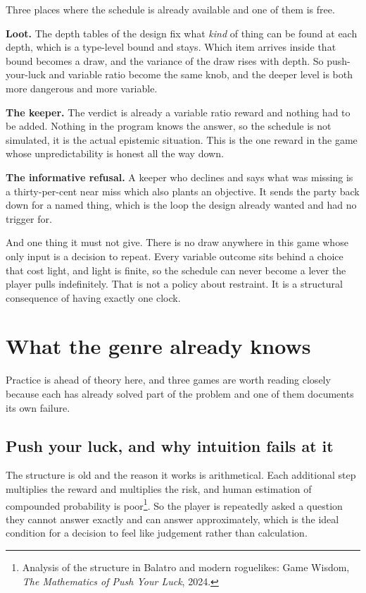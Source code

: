 \documentclass[11pt,a4paper]{article}
\begin{document}
Three places where the schedule is already available and one of them is free.

\textbf{Loot.} The depth tables of the design fix what \emph{kind} of thing can be found at each
depth, which is a type-level bound and stays. Which item arrives inside that bound becomes a
draw, and the variance of the draw rises with depth. So push-your-luck and variable ratio become
the same knob, and the deeper level is both more dangerous and more variable.

\textbf{The keeper.} The verdict is already a variable ratio reward and nothing had to be added.
Nothing in the program knows the answer, so the schedule is not simulated, it is the actual
epistemic situation. This is the one reward in the game whose unpredictability is honest all the
way down.

\textbf{The informative refusal.} A keeper who declines and says what was missing is a
thirty-per-cent near miss which also plants an objective. It sends the party back down for a
named thing, which is the loop the design already wanted and had no trigger for.

\begin{alarmbox}
And one thing it must not give. There is no draw anywhere in this game whose only input is a
decision to repeat. Every variable outcome sits behind a choice that cost light, and light is
finite, so the schedule can never become a lever the player pulls indefinitely. That is not a
policy about restraint. It is a structural consequence of having exactly one clock.
\end{alarmbox}

\section{What the genre already knows}

Practice is ahead of theory here, and three games are worth reading closely because each has
already solved part of the problem and one of them documents its own failure.

\subsection{Push your luck, and why intuition fails at it}

The structure is old and the reason it works is arithmetical. Each additional step multiplies the
reward and multiplies the risk, and human estimation of compounded probability is
poor\footnote{Analysis of the structure in Balatro and modern roguelikes: Game Wisdom, \emph{The
Mathematics of Push Your Luck}, 2024.}. So the player is repeatedly asked a question they
cannot answer exactly and can answer approximately, which is the ideal condition for a decision
to feel like judgement rather than calculation.
\end{document}
